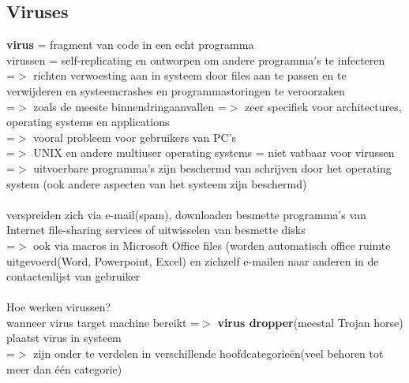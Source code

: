 \documentclass{report}
\begin{document}
\subsection{Viruses}
\textbf{virus} = fragment van code in een echt programma
\\virussen = self-replicating en ontworpen om andere programma's te infecteren
\\=$>$ richten verwoesting aan in systeem door files aan te passen en te verwijderen en systeemcrashes en programmastoringen te veroorzaken
\\=$>$ zoals de meeste binnendringaanvallen =$>$ zeer specifiek voor architectures, operating systems en applications
\\=$>$ vooral probleem voor gebruikers van PC's
\\ =$>$ UNIX en andere multiuser operating systems = niet vatbaar voor virussen =$>$ uitvoerbare programma's zijn beschermd van schrijven door het operating system (ook andere aspecten van het systeem zijn beschermd)
\\
\\verspreiden zich via e-mail(spam), downloaden besmette programma's van Internet file-sharing services of  uitwisselen van besmette disks
\\=$>$ ook via macros in Microsoft Office files (worden automatisch office ruimte uitgevoerd(Word, Powerpoint, Excel) en zichzelf e-mailen naar anderen in de contactenlijst van gebruiker
\\
\\Hoe werken virussen?
\\wanneer virus target machine bereikt =$>$ \textbf{virus dropper}(meestal Trojan horse) plaatst virus in systeem
\\=$>$ zijn onder te verdelen in verschillende hoofdcategorie\"en(veel behoren tot meer dan \'e\'en categorie)
\end{document}
